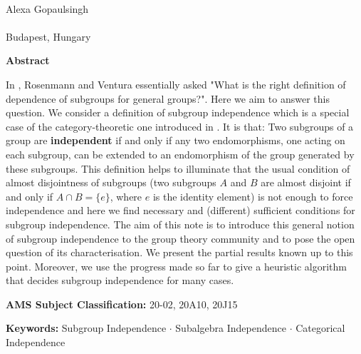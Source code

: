 \documentclass{article}
\begin{document}
	
	
	
	
	\begin{center}
			\\
		
		\vspace{0.8cm}
		Alexa Gopaulsingh\\
		
		\vspace{1mm}
		\\
		Budapest, Hungary\\
		
	\end{center}
	
	\vspace{1cm}
	
	
	\begin{center}
		\noindent \textbf{Abstract}
	\end{center}
	
	{\small In \cite{MainC},  Rosenmann and Ventura essentially asked "What is the right definition of dependence of subgroups for general groups?".  Here we aim to answer this question. We consider a definition of subgroup independence which is a special case of the category-theoretic one introduced in \cite{Z1}. It is that: Two subgroups of a group are \textbf{independent} if and only if any  two endomorphisms, one acting on each subgroup, can be extended to an endomorphism of the group generated by these subgroups.  This definition helps to illuminate that the usual condition of almost disjointness  of subgroups (two subgroups  $A$ and $B$  are almost disjoint if and only if $A \cap B = \{e\}$, where $e$ is the identity element) is not enough to force independence and here we find necessary and (different) sufficient conditions for subgroup independence. The aim of this note is to introduce this general notion of subgroup independence to the group theory community and to pose the open question of its characterisation. We present the partial results known up to this point.  Moreover, we use the progress made so far to give a heuristic algorithm that decides subgroup independence for many cases.}
	
	\vspace{5mm} 
	
	\noindent \textbf{AMS Subject Classification:} 20-02, 20A10, 20J15
	
	\noindent \textbf{Keywords:}  Subgroup Independence $\cdot$ Subalgebra  Independence $\cdot$ Categorical Independence
	\\
	
\end{document}
